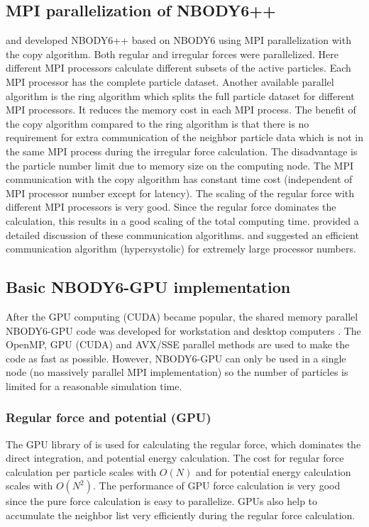 \documentclass[usenatbib,aas_macros]{mn2e}
\def\nbody{NBODY6 }
\def\nbodypp{NBODY6++ }
\def\nbodygpu{NBODY6-GPU }
\begin{document}
\subsection{MPI parallelization of NBODY6++}

\cite{Spurzem1999} and \cite{Hemsendorf2003} developed \nbodypp based on \nbody using MPI parallelization with the copy algorithm.  
Both regular and irregular forces were parallelized. 
Here different MPI processors calculate different subsets of the active particles. 
Each MPI processor has the complete particle dataset. 
Another available parallel algorithm is the ring algorithm which splits the full particle dataset for different MPI processors. It reduces the memory cost in each MPI process. 
The benefit of the copy algorithm compared to the ring algorithm is that there is no requirement for extra communication of the neighbor particle data which is not in the same MPI process during the irregular force calculation. 
The disadvantage is the particle number limit due to memory size on the computing node.  
The MPI communication with the copy algorithm has constant time cost (independent of MPI processor number except for latency).
The scaling of the regular force with different MPI processors is very good. 
Since the regular force dominates the calculation, this results in a good scaling of the total computing time.
\cite{Dorband2003} provided a detailed discussion of these communication algorithms. 
\cite{Lippert1998} and \cite{Makino2002} suggested an efficient communication algorithm (hypersystolic) for extremely large processor numbers.

\subsection{Basic NBODY6-GPU implementation}
After the GPU computing (CUDA) became popular, the shared memory parallel \nbodygpu code was developed for workstation and desktop computers \citep{Nitadori2012}. 
The OpenMP, GPU (CUDA) and AVX/SSE parallel methods are used to make the code as fast as possible.
However, \nbodygpu can only be used in a single node (no massively parallel MPI implementation) so the number of particles is limited for a reasonable simulation time.

\subsubsection{Regular force and potential (GPU)}
The GPU library of \cite{Nitadori2012} is used for calculating the regular force, which dominates the direct integration, and potential energy calculation. 
The cost for regular force calculation per particle scales with $O(N)$ and for potential energy calculation scales with $O(N^2)$. 
The performance of GPU force calculation is very good since the pure force calculation is easy to parallelize. 
GPUs also help to accumulate the neighbor list very efficiently during the regular force calculation.
\end{document}
